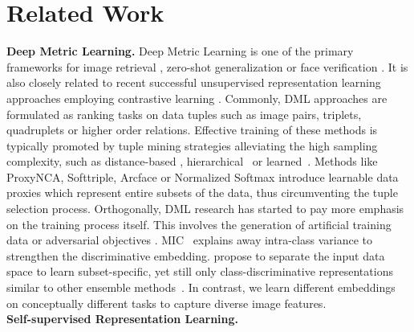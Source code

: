 \documentclass[runningheads]{llncs}
\begin{document}
\section{Related Work}
\label{sec:Related_Works} 
\noindent
\textbf{Deep Metric Learning.} 
Deep Metric Learning is one of the primary frameworks for image retrieval \cite{proxynca,dvml,mic,margin}, zero-shot generalization \cite{semihard,mic,Sanakoyeu_2019_CVPR,cliquecnn} or face verification \cite{face_verfication_inthewild,sphereface,arcface}. It is also closely related to recent successful unsupervised representation learning approaches employing contrastive learning \cite{moco,pretextmisra,newhintonpaper}. Commonly, DML approaches are formulated as ranking tasks on data tuples such as image pairs\cite{contrastive}, triplets\cite{face_verfication_inthewild,margin}, quadruplets\cite{quadtruplet} or higher order relations\cite{npairs,lifted,multisimilarity}. Effective training of these methods is typically promoted by tuple mining strategies alleviating the high sampling complexity, such as distance-based \cite{semihard,margin}, hierarchical~\cite{htl} or learned~\cite{Roth_2020_CVPR}. Methods like ProxyNCA\cite{proxynca}, Softtriple\cite{arcface}, Arcface\cite{arcface} or Normalized Softmax\cite{zhai2018classification} introduce learnable data proxies which represent entire subsets of the data, thus circumventing the tuple selection process. Orthogonally, DML research has started to pay more emphasis on the training process itself. This involves the generation of artificial training data \cite{dvml,hardness-aware} or adversarial objectives \cite{daml}. MIC~\cite{mic} explains away intra-class variance to strengthen the discriminative embedding. \cite{Sanakoyeu_2019_CVPR} propose to separate the input data space to learn subset-specific, yet still only class-discriminative representations similar to other ensemble methods~\cite{dreml,abe,abier,milbich_pami_20}. In contrast, we learn different embeddings on conceptually different tasks to capture diverse image features.
\\
\noindent
\textbf{Self-supervised Representation Learning.}
\end{document}

